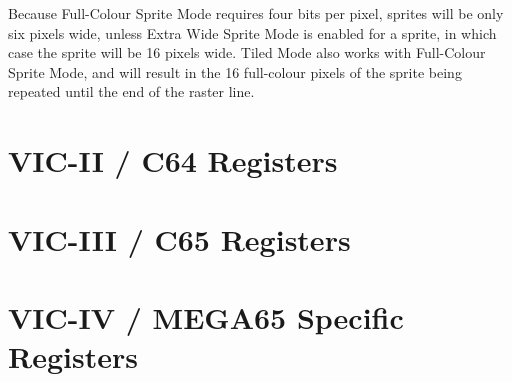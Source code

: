 Because Full-Colour Sprite Mode requires four bits per pixel, sprites will be only six pixels wide, unless Extra Wide Sprite Mode is enabled
for a sprite, in which case the sprite will be 16 pixels wide.  Tiled Mode also works with Full-Colour Sprite Mode, and will result in the
16 full-colour pixels of the sprite being repeated until the end of the raster line.

\section{VIC-II / C64 Registers}



\section{VIC-III / C65 Registers}



\section{VIC-IV / MEGA65 Specific Registers}


